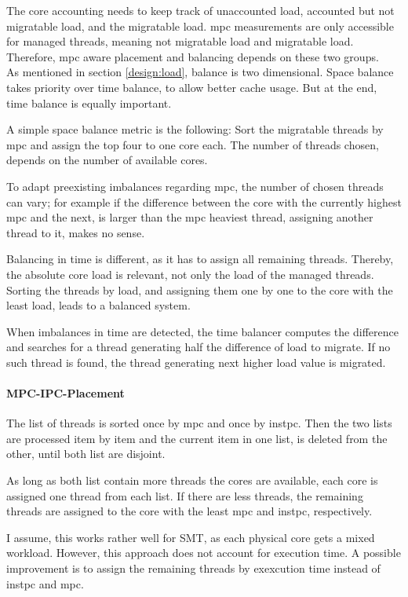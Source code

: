 The core accounting needs to keep track of unaccounted load, accounted but
not migratable load, and the migratable load.
\Gls{mpc} measurements are only accessible for managed threads, meaning not
migratable load and migratable load.
Therefore, \gls{mpc} aware placement and balancing depends on these two
groups.
\\

As mentioned in section \ref{design:load}, balance is two dimensional.
Space balance takes priority over time balance, to allow better cache usage.
But at the end, time balance is equally important.

A simple space balance metric is the following: Sort the migratable threads by
\gls{mpc} and assign the top four to one core each.
The number of threads chosen, depends on the number of available cores.

To adapt preexisting imbalances regarding \gls{mpc},  the number of chosen
threads can vary; for example if the difference between the core with the
currently highest \gls{mpc} and the next, is larger than the \gls{mpc} heaviest
thread, assigning another thread to it, makes no sense.

Balancing in time is different, as it has to assign all remaining threads.
Thereby, the absolute core load is relevant, not only the load of the managed
threads.
Sorting the threads by load, and assigning them one by one to the
core with the least load, leads to a balanced system.

When imbalances in time are detected, the time balancer computes the difference
and searches for a thread generating half the difference of load to migrate.
If no such thread is found, the thread generating next higher load value is
migrated.


\paragraph{MPC-IPC-Placement}
The list of threads is sorted once by \gls{mpc} and once by \gls{instpc}.
Then the two lists are processed item by item and the current item in one list,
is deleted from the other, until both list are disjoint.

As long as both list contain more threads the cores are available, each core
is assigned one thread from each list.
If there are less threads, the remaining threads are assigned to the core with
the least \gls{mpc} and \gls{instpc}, respectively.

I assume, this works rather well for SMT, as each physical core gets a mixed
workload.
However, this approach does not account for execution time.
A possible improvement is to assign the remaining threads by
exexcution time instead of \gls{instpc} and \gls{mpc}.



